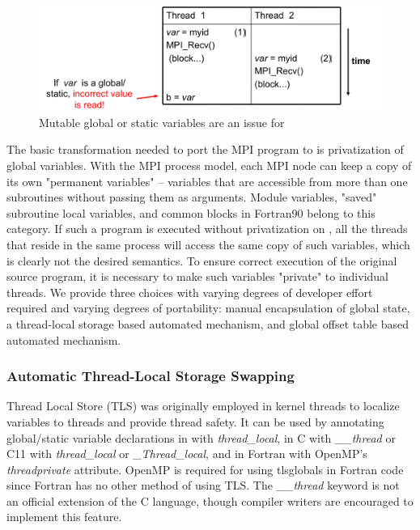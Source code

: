 \documentclass[10pt]{article}
\begin{document}
\begin{figure}[h]
\centering
\includegraphics[width=4.6in]{figs/global.png}
\caption{Mutable global or static variables are an issue for \ampi{}}
\label{fig_global}
\end{figure}

The basic transformation needed to port the MPI program to \ampi{} is
privatization of global variables.
With the MPI process model, each MPI node can keep a copy of its own
"permanent variables" -- variables that are accessible from more than one
subroutines without passing them as arguments.  Module variables, "saved"
subroutine local variables, and common blocks in Fortran90 belong to this
category. If such a program is executed without privatization on \ampi{}, all
the \ampi{} threads that reside in the same process will access the same copy of
such variables, which is clearly not the desired semantics.  To ensure correct
execution of the original source program, it is necessary to make such
variables "private" to individual threads. We provide three choices with varying
degrees of developer effort required and varying degrees of portability:
manual encapsulation of global state, a thread-local storage based automated mechanism, and
global offset table based automated mechanism.

\subsubsection{Automatic Thread-Local Storage Swapping}
Thread Local Store (TLS) was originally employed in kernel threads to
localize variables to threads and provide thread safety. It can be used by annotating
global/static variable declarations in \CC{} with \emph{thread\_local}, in C with \emph{\_\_thread}
or C11 with \emph{thread\_local} or \emph{\_Thread\_local},
and in Fortran with OpenMP's \emph{threadprivate} attribute. OpenMP is required for using tlsglobals
in Fortran code since Fortran has no other method of using TLS. The \emph{\_\_thread} keyword is
not an official extension of the C language, though compiler writers are encouraged to implement
this feature.
\end{document}
